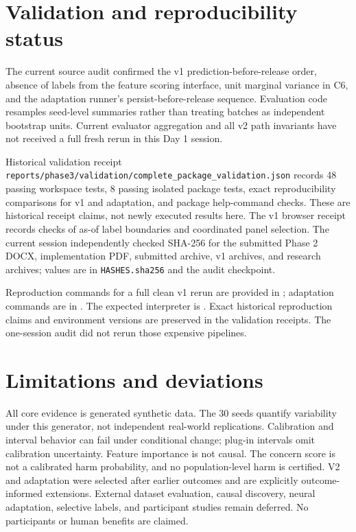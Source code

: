 \documentclass[10pt]{article}
\begin{document}
\section{Validation and reproducibility status}
The current source audit confirmed the v1 prediction-before-release order, absence of labels from the feature scoring interface, unit marginal variance in C6, and the adaptation runner's persist-before-release sequence. Evaluation code resamples seed-level summaries rather than treating batches as independent bootstrap units. Current evaluator aggregation and all v2 path invariants have not received a full fresh rerun in this Day 1 session.

Historical validation receipt \texttt{reports/phase3/validation/complete\_package\_validation.json} records 48 passing workspace tests, 8 passing isolated package tests, exact reproducibility comparisons for v1 and adaptation, and package help-command checks. These are historical receipt claims, not newly executed results here. The v1 browser receipt records checks of as-of label boundaries and coordinated panel selection. The current session independently checked SHA-256 for the submitted Phase 2 DOCX, implementation PDF, submitted archive, v1 archives, and research archives; values are in \texttt{HASHES.sha256} and the audit checkpoint.

\begin{sloppypar}
Reproduction commands for a full clean v1 rerun are provided in ; adaptation commands are in . The expected interpreter is . Exact historical reproduction claims and environment versions are preserved in the validation receipts. The one-session audit did not rerun those expensive pipelines.
\end{sloppypar}

\section{Limitations and deviations}
All core evidence is generated synthetic data. The 30 seeds quantify variability under this generator, not independent real-world replications. Calibration and interval behavior can fail under conditional change; plug-in intervals omit calibration uncertainty. Feature importance is not causal. The concern score is not a calibrated harm probability, and no population-level harm is certified. V2 and adaptation were selected after earlier outcomes and are explicitly outcome-informed extensions. External dataset evaluation, causal discovery, neural adaptation, selective labels, and participant studies remain deferred. No participants or human benefits are claimed.
\end{document}
